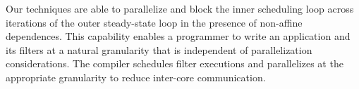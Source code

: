 Our techniques are able to parallelize and block the inner scheduling
loop across iterations of the outer steady-state loop in the presence
of non-affine dependences.  This capability enables a programmer to
write an application and its filters at a natural granularity that is 
independent of parallelization considerations.  The compiler
schedules filter executions and parallelizes at the appropriate
granularity to reduce inter-core communication.





